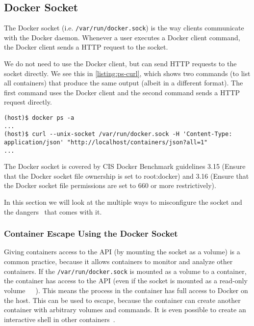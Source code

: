 \subsection{Docker Socket}\label{subsection:api}
The Docker socket (i.e. \lstinline{/var/run/docker.sock}) is the way clients communicate with the Docker daemon. Whenever a user executes a Docker client command, the Docker client sends a HTTP request to the socket.

We do not need to use the Docker client, but can send HTTP requests to the socket directly. We see this in \autoref{listing:ps-curl}, which shows two commands (to list all containers) that produce the same output (albeit in a different format). The first command uses the Docker client and the second command sends a HTTP request directly.
\begin{lstlisting}[caption={Interaction with the Docker daemon with the Docker client and the socket directly.},captionpos=b, label={listing:ps-curl}]
(host)$ docker ps -a
...
(host)$ curl --unix-socket /var/run/docker.sock -H 'Content-Type: application/json' "http://localhost/containers/json?all=1"
...
\end{lstlisting}

\medskip

The Docker socket is covered by CIS Docker Benchmark guidelines 3.15 (Ensure that the Docker socket file ownership is set to root:docker) and 3.16 (Ensure that the Docker socket file permissions are set to 660 or more restrictively).

\medskip

In this section we will look at the multiple ways to misconfigure the socket and the dangers~\cite{The-Dangers-Of-Docker-Sock} that comes with it.

\subsubsection{Container Escape Using the Docker Socket}\label{socket:escape}
Giving containers access to the API (by mounting the socket as a volume) is a common practice, because it allows containers to monitor and analyze other containers. If the \lstinline{/var/run/docker.sock} is mounted as a volume to a container, the container has access to the API (even if the socket is mounted as a read-only volume~\cite{The-Dangers-Of-Docker-Sock}~\cite{Read-Only-Docker-Socket-Tweet}~\cite{Read-Only-Docker-Socket-Hackernews}). This means the process in the container has full access to Docker on the host. This can be used to escape, because the container can create another container with arbitrary volumes and commands. It is even possible to create an interactive shell in other containers~\cite{Escape-Socket-Shell}.

